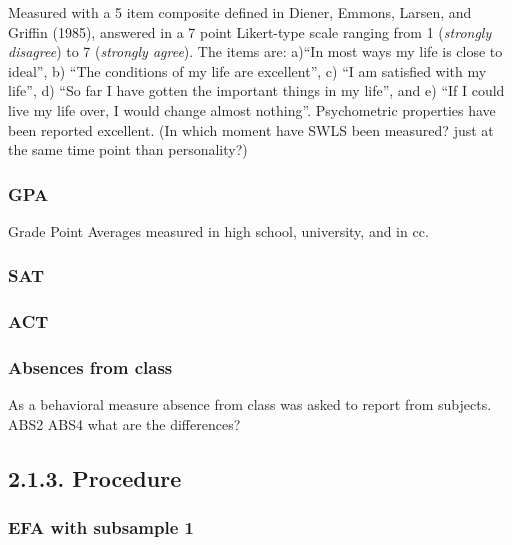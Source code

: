 \documentclass[,man]{apa6}
\theoremstyle{definition}
\theoremstyle{definition}
\theoremstyle{definition}
\theoremstyle{remark}
\begin{document}
Measured with a 5 item composite defined in Diener, Emmons, Larsen, and
Griffin (1985), answered in a 7 point Likert-type scale ranging from 1
(\emph{strongly disagree}) to 7 (\emph{strongly agree}). The items are:
a)\enquote{In most ways my life is close to ideal}, b) \enquote{The
conditions of my life are excellent}, c) \enquote{I am satisfied with my
life}, d) \enquote{So far I have gotten the important things in my
life}, and e) \enquote{If I could live my life over, I would change
almost nothing}. Psychometric properties have been reported excellent.
(In which moment have SWLS been measured? just at the same time point
than personality?)

\hypertarget{gpa}{%
\subsubsection{GPA}\label{gpa}}

Grade Point Averages measured in high school, university, and in cc.

\hypertarget{sat}{%
\subsubsection{SAT}\label{sat}}

\hypertarget{act}{%
\subsubsection{ACT}\label{act}}

\hypertarget{absences-from-class}{%
\subsubsection{Absences from class}\label{absences-from-class}}

As a behavioral measure absence from class was asked to report from
subjects. ABS2 ABS4 what are the differences?

\hypertarget{procedure}{%
\subsection{2.1.3. Procedure}\label{procedure}}

\hypertarget{efa-with-subsample-1}{%
\subsubsection{EFA with subsample 1}\label{efa-with-subsample-1}}
\end{document}
